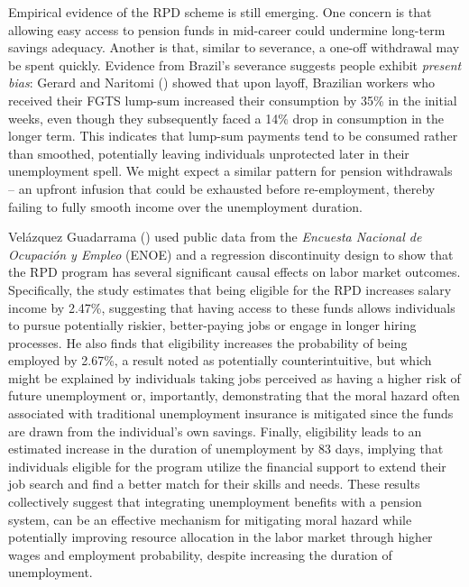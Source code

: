 \documentclass[
  4pt,
]{report}
\begin{document}
Empirical evidence of the RPD scheme is still emerging. One concern is
that allowing easy access to pension funds in mid-career could undermine
long-term savings adequacy. Another is that, similar to severance, a
one-off withdrawal may be spent quickly. Evidence from Brazil's
severance suggests people exhibit \emph{present bias}: Gerard and
Naritomi () showed that upon layoff,
Brazilian workers who received their FGTS lump-sum increased their
consumption by 35\% in the initial weeks, even though they subsequently
faced a 14\% drop in consumption in the longer term. This indicates that
lump-sum payments tend to be consumed rather than smoothed, potentially
leaving individuals unprotected later in their unemployment spell. We
might expect a similar pattern for pension withdrawals -- an upfront
infusion that could be exhausted before re-employment, thereby failing
to fully smooth income over the unemployment duration.

Velázquez Guadarrama ()
used public data from the \emph{Encuesta Nacional de Ocupación y Empleo}
(ENOE) and a regression discontinuity design to show that the RPD
program has several significant causal effects on labor market outcomes.
Specifically, the study estimates that being eligible for the RPD
increases salary income by 2.47\%, suggesting that having access to
these funds allows individuals to pursue potentially riskier,
better-paying jobs or engage in longer hiring processes. He also finds
that eligibility increases the probability of being employed by 2.67\%,
a result noted as potentially counterintuitive, but which might be
explained by individuals taking jobs perceived as having a higher risk
of future unemployment or, importantly, demonstrating that the moral
hazard often associated with traditional unemployment insurance is
mitigated since the funds are drawn from the individual's own savings.
Finally, eligibility leads to an estimated increase in the duration of
unemployment by 83 days, implying that individuals eligible for the
program utilize the financial support to extend their job search and
find a better match for their skills and needs. These results
collectively suggest that integrating unemployment benefits with a
pension system, can be an effective mechanism for mitigating moral
hazard while potentially improving resource allocation in the labor
market through higher wages and employment probability, despite
increasing the duration of unemployment.
\end{document}
